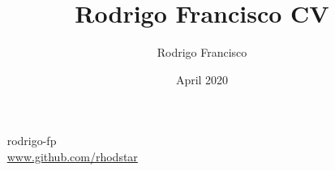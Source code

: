 \documentclass[blue]{pastelcv}              %
\begin{document}
\title{Rodrigo Francisco CV}
\author{Rodrigo Francisco}
\date{April 2020}

\graphicspath{{assets/}}

\thispagestyle{empty}

\begin{center}
  \jobdescription{\jobdescriptionText}
 
  \getgreyishblackfont
  {
    \small 
  \faLinkedin~ rodrigo-fp\\[2mm]
  \faGithub~ \protect\url{www.github.com/rhodstar}
  }

\end{center}

\vspace{-2mm}
\begin{center}
  \small \summaryText 
\end{center}
\vspace{2mm}
\end{document}
